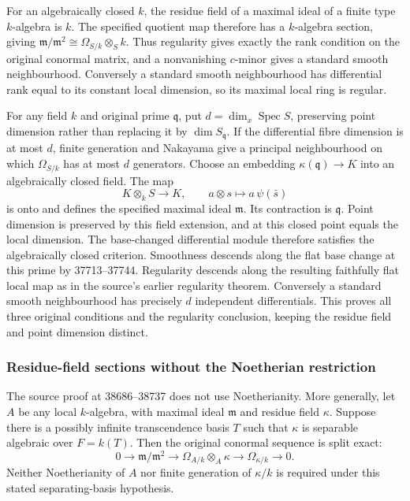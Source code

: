 For an algebraically closed \(k\), the residue field of a maximal ideal of a finite type \(k\)-algebra is \(k\). The specified quotient map therefore has a \(k\)-algebra section, giving \(\mathfrak m/\mathfrak m^2\cong\Omega_{S/k}\otimes_S k\). Thus regularity gives exactly the rank condition on the original conormal matrix, and a nonvanishing \(c\)-minor gives a standard smooth neighbourhood. Conversely a standard smooth neighbourhood has differential rank equal to its constant local dimension, so its maximal local ring is regular.

For any field \(k\) and original prime \(\mathfrak q\), put \(d=\dim_x\operatorname{Spec}S\), preserving point dimension rather than replacing it by \(\dim S_{\mathfrak q}\). If the differential fibre dimension is at most \(d\), finite generation and Nakayama give a principal neighbourhood on which \(\Omega_{S/k}\) has at most \(d\) generators. Choose an embedding \(\kappa(\mathfrak q)\to K\) into an algebraically closed field. The map \[
K\otimes_kS\longrightarrow K,\qquad a\otimes s\longmapsto a\,\psi(\bar s)
\] is onto and defines the specified maximal ideal \(\mathfrak m\). Its contraction is \(\mathfrak q\). Point dimension is preserved by this field extension, and at this closed point equals the local dimension. The base-changed differential module therefore satisfies the algebraically closed criterion. Smoothness descends along the flat base change at this prime by 37713--37744. Regularity descends along the resulting faithfully flat local map as in the source's earlier regularity theorem. Conversely a standard smooth neighbourhood has precisely \(d\) independent differentials. This proves all three original conditions and the regularity conclusion, keeping the residue field and point dimension distinct.

\subsubsection{Residue-field sections without the Noetherian restriction}\label{algebra-proof-049-residue-field-sections-without-the-noetherian-restriction}

The source proof at 38686--38737 does not use Noetherianity. More generally, let \(A\) be any local \(k\)-algebra, with maximal ideal \(\mathfrak m\) and residue field \(\kappa\). Suppose there is a possibly infinite transcendence basis \(T\) such that \(\kappa\) is separable algebraic over \(F=k(T)\). Then the original conormal sequence is split exact: \[
0\longrightarrow\mathfrak m/\mathfrak m^2
\longrightarrow\Omega_{A/k}\otimes_A\kappa
\longrightarrow\Omega_{\kappa/k}\longrightarrow0.
\] Neither Noetherianity of \(A\) nor finite generation of \(\kappa/k\) is required under this stated separating-basis hypothesis.

